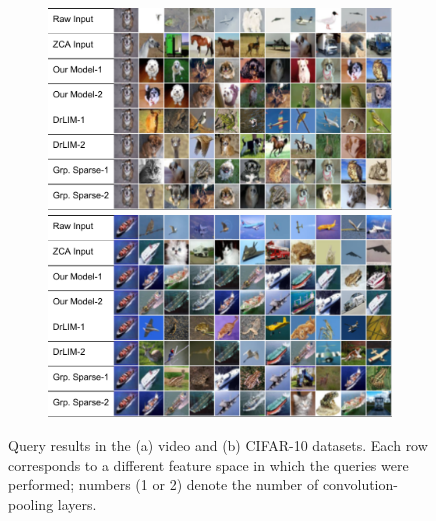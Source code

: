 \documentclass{article} %
\begin{document}
\begin{figure}
\begin{subfigure}[b]{0.45\textwidth}
       \includegraphics[width=\textwidth, trim = 0 0 34 0, clip]{./Rebbutal_Figures/NNclass1.pdf}
       \includegraphics[width=\textwidth, trim = 0 0 34 0, clip]{./Rebbutal_Figures/NNclass2.pdf}
        \caption{}
        \label{fig:cifarquery}
  \end{subfigure}
  \caption{Query results in the (a) video and (b) CIFAR-10 datasets. Each row corresponds to a different feature space in which the queries were performed; numbers (1 or 2) denote the number of convolution-pooling layers. \label{fig:query}}  
   \label{fig:query}
\end{figure}
\end{document}
